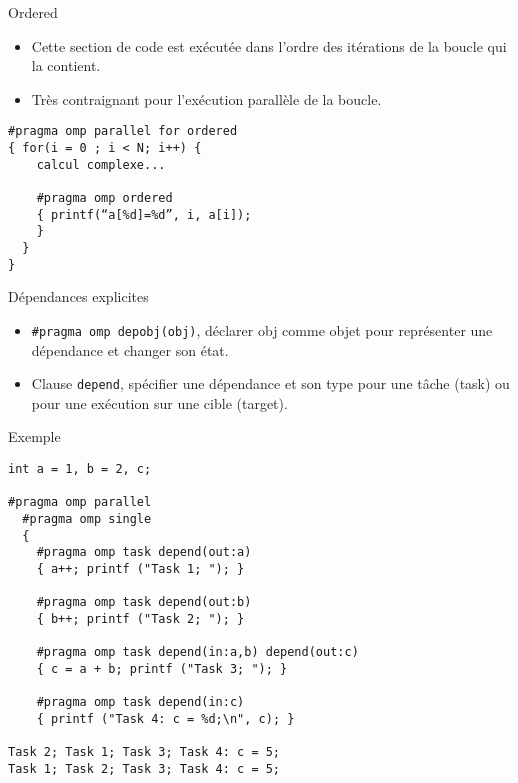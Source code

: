 \documentclass[10pt]{beamer}
\begin{document}
\begin{frame}[fragile]{Ordered}

  \begin{itemize}
    \item Cette section de code est exécutée dans l'ordre des itérations de la boucle qui la contient.

    \item Très contraignant pour l'exécution parallèle de la boucle.
  \end{itemize}
  \begin{verbatim}
#pragma omp parallel for ordered
{ for(i = 0 ; i < N; i++) { 
    calcul complexe...

    #pragma omp ordered
    { printf(“a[%d]=%d”, i, a[i]); 
    }
  }
}
  \end{verbatim}
\end{frame}

\begin{frame}[fragile]{Dépendances explicites}

  \begin{itemize}
    \item \verb|#pragma omp depobj(obj)|, déclarer obj comme objet pour représenter une dépendance et changer son état.

    \item Clause \texttt{depend}, spécifier une dépendance et son type pour une tâche (task) ou pour une exécution sur une cible (target).

  \end{itemize}
\end{frame}

\begin{frame}[fragile]{Exemple}

  \scriptsize
  \begin{verbatim}
int a = 1, b = 2, c;

#pragma omp parallel
  #pragma omp single
  {
    #pragma omp task depend(out:a)
    { a++; printf ("Task 1; "); }
    
    #pragma omp task depend(out:b)
    { b++; printf ("Task 2; "); }

    #pragma omp task depend(in:a,b) depend(out:c)
    { c = a + b; printf ("Task 3; "); }

    #pragma omp task depend(in:c)
    { printf ("Task 4: c = %d;\n", c); }

Task 2; Task 1; Task 3; Task 4: c = 5;
Task 1; Task 2; Task 3; Task 4: c = 5;
  \end{verbatim}
\end{frame}
\end{document}
